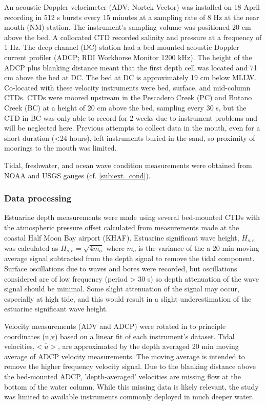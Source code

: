 An acoustic Doppler velocimeter (ADV; Nortek Vector) was installed
on 18 April recording in 512 s bursts every 15 minutes at a sampling
rate of 8 Hz at the near mouth (NM) station. The instrument's sampling
volume was positioned 20 cm above the bed. A collocated CTD recorded
salinity and pressure at a frequency of 1 Hz. The deep channel (DC)
station had a bed-mounted acoustic Doppler current profiler (ADCP;
RDI Workhorse Monitor 1200 kHz). The height of the ADCP plus blanking
distance meant that the first depth cell was located and 71 cm above
the bed at DC. The bed at DC is approximately 19 cm below MLLW. Co-located
with these velocity instruments were bed, surface, and mid-column
CTDs. CTDs were moored upstream in the Pescadero Creek (PC) and Butano
Creek (BC) at a height of 20 cm above the bed, sampling every 30 s,
but the CTD in BC was only able to record for 2 weeks due to instrument
problems and will be neglected here. Previous attempts to collect
data in the mouth, even for a short duration (<24 hours), left instruments
buried in the sand, so proximity of moorings to the mouth was limited. 

Tidal, freshwater, and ocean wave condition measurements were obtained
from NOAA and USGS gauges (cf. \ref{sub:ext_cond}).


\subsubsection{Data processing\label{sub:Data-processing}}

Estuarine depth measurements were made using several bed-mounted CTDs
with the atmospheric pressure offset calculated from measurements
made at the coastal Half Moon Bay airport (KHAF). Estuarine significant
wave height, $H_{s,e}$ was calculated as $H_{s,e}=\sqrt{4m_{o}}$
where $m_{o}$ is the variance of the a 20 min moving average signal
subtracted from the depth signal to remove the tidal component. Surface
oscillations due to waves and bores were recorded, but oscillations
considered are of low frequency (period > 30 s) so depth attenuation
of the wave signal should be minimal. Some slight attenuation of the
signal may occur, especially at high tide, and this would result in
a slight underestimation of the estuarine significant wave height.

Velocity measurements (ADV and ADCP) were rotated in to principle
coordinates (u,v) based on a linear fit of each instrument's dataset.
Tidal velocities,$\overline{<u>}$, are approximated by the depth
averaged 20 min moving average of ADCP velocity measurements. The
moving average is intended to remove the higher frequency velocity
signal. Due to the blanking distance above the bed-mounted ADCP, 'depth-averaged'
velocities are missing flow at the bottom of the water column. While
this missing data is likely relevant, the study was limited to available
instruments commonly deployed in much deeper water.

